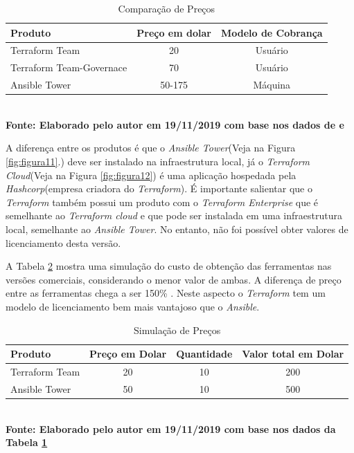    \begin{table}[H]
	\centering
	\caption{\hspace{0.1cm} Comparação de Preços}
	\vspace{-0.3cm} %
	\label{tab:tabela4}
	\begin{tabular}{l|c|c}
  \hline
    \textbf{Produto}	& \textbf{Preço em dolar} & \textbf{Modelo de Cobrança} \\
    \hline
  Terraform Team & 20  & Usuário\\
  Terraform Team-Governace  & 70 &   Usuário  \\
  Ansible Tower  & 50-175 &   Máquina  \\
     \hline
 \end{tabular}
 	\vspace{.1cm}  %
	\small
	{\footnotesize\\ \textbf{Fonte: Elaborado pelo autor em 19/11/2019 com base nos dados de \textit{\cite{opensource.io}} e  \textit{\cite{hashcorp3}}}}
\end{table}

A diferença entre os produtos é que o \textit{Ansible Tower}(Veja na Figura \ref{fig:figura11}.) deve ser instalado na infraestrutura local, já o \textit{Terraform Cloud}(Veja na Figura \ref{fig:figura12})  é uma aplicação hospedada pela \textit{Hashcorp}(empresa criadora do \textit{Terraform}). É importante salientar que o \textit{Terraform} também possui um produto com o \textit{Terraform Enterprise} que é semelhante ao \textit{Terraform cloud} e  que pode ser instalada em uma infraestrutura local, semelhante ao \textit{Ansible Tower}. No entanto, não foi possível obter valores de licenciamento desta versão.  


A Tabela \ref{tab:tabela5} mostra uma simulação  do custo de obtenção das ferramentas nas versões comerciais, considerando o menor valor de ambas. A diferença de preço entre as ferramentas chega a ser 150\% . Neste aspecto o \textit{Terraform} tem um modelo de licenciamento bem mais vantajoso que o \textit{Ansible}.  


   \begin{table}[H]
	\centering
	\caption{\hspace{0.1cm} Simulação de Preços}
	\vspace{-0.3cm} %
	\label{tab:tabela5}
	\begin{tabular}{l|c|c|c}
  \hline
    \textbf{Produto} & \textbf{Preço em Dolar} & \textbf{Quantidade}  & \textbf{Valor total em Dolar} \\
    \hline
  Terraform Team & 20  & 10 & 200\\
  Ansible Tower  & 50 & 10 & 500\\
     \hline
 \end{tabular}
 	\vspace{.1cm}  %
	\small
	{\footnotesize\\ \textbf{Fonte: Elaborado pelo autor em 19/11/2019 com base nos dados da Tabela \ref{tab:tabela4}}}
\end{table}


